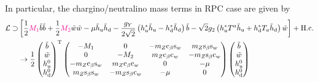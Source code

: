 \documentclass[CheatSheet]{subfiles}
\begin{document}
\clearpage

In particular, the chargino/neutralino mass terms in RPC case are given by
\begin{align}
 \mathcal L\supset
&\left[
  \frac12{{\color{magenta}M_1}}\tilde b\tilde b
+ \frac12{{\color{magenta}M_2}}\tilde w\tilde w
- \mu\tilde h_{\mathrm{u}}\tilde h_{\mathrm{d}}
- \frac{g_Y}{2\sqrt2} \left(h_{\mathrm{u}}^*\tilde h_{\mathrm{u}}-h_{\mathrm{d}}^*\tilde h_{\mathrm{d}}\right)\tilde b
- \sqrt{2}{g_2} \left(h_{\mathrm{u}}^*T^a\tilde h_{\mathrm{u}}+h_{\mathrm{d}}^*T_a\tilde h_{\mathrm{d}}\right)\tilde w
\right]+\text{H.c.}
\\
&\to
\frac{1}{2}
\begin{pmatrix}\tilde b \\ \tilde w \\ h_{\mathrm{u}}^0 \\ h_{\mathrm{d}}^0\end{pmatrix}^{\mathrm{T}}
\begin{pmatrix}
 -M_1 & 0 & -m_Z \mathrm{c}_{\beta} \mathrm{s}_{w} & m_Z \mathrm{s}_{\beta} \mathrm{s}_{w} \\
 0 & -M_ 2 & m_Z \mathrm{c}_{\beta} \mathrm{c}_{w} & -m_Z \mathrm{s}_{\beta} \mathrm{c}_{w} \\
 -m_Z \mathrm{c}_{\beta} \mathrm{s}_{w} & m_Z \mathrm{c}_{\beta} \mathrm{c}_{w} & 0 & -\mu  \\
 m_Z \mathrm{s}_{\beta} \mathrm{s}_{w} & -m_Z \mathrm{s}_{\beta} \mathrm{c}_{w} & -\mu  & 0
\end{pmatrix}
\begin{pmatrix}\tilde b \\ \tilde w \\ h_{\mathrm{u}}^0 \\ h_{\mathrm{d}}^0\end{pmatrix}
\end{align}
\end{document}
